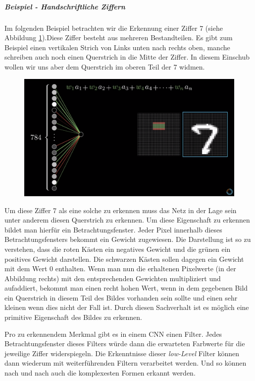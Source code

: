 \subparagraph{Beispiel - Handschriftliche Ziffern}
Im folgenden Beispiel betrachten wir die Erkennung einer Ziffer 7 (siehe Abbildung \ref{fig:cnn_filter}).Diese Ziffer besteht aus mehreren Bestandteilen. Es gibt zum Beispiel einen vertikalen Strich von Links unten nach rechts oben, manche schreiben auch noch einen Querstrich in die Mitte der Ziffer. In diesem Einschub wollen wir uns aber dem Querstrich im oberen Teil der 7 widmen. 

\begin{figure}[!htb]
	\centering
	\includegraphics[width=.7\linewidth]{img/filter}
	\label{fig:cnn_filter}
\end{figure}

Um diese Ziffer 7 als eine solche zu erkennen muss das Netz in der Lage sein unter anderem diesen Querstrich zu erkennen. Um diese Eigenschaft zu erkennen bildet man hierfür ein Betrachtungsfenster. Jeder Pixel innerhalb dieses Betrachtungsfensters bekommt ein Gewicht zugewiesen. Die Darstellung ist so zu verstehen, dass die roten Kästen ein negatives Gewicht und die grünen ein positives Gewicht darstellen. Die schwarzen Kästen sollen dagegen ein Gewicht mit dem Wert $0$ enthalten. Wenn man nun die erhaltenen Pixelwerte (in der Abbildung rechts) mit den entsprechenden Gewichten multipliziert und aufaddiert, bekommt man einen recht hohen Wert, wenn in dem gegebenen Bild ein Querstrich in diesem Teil des Bildes vorhanden sein sollte und einen sehr kleinen wenn dies nicht der Fall ist. Durch diesen Sachverhalt ist es möglich eine primitive Eigenschaft des Bildes zu erkennen.  

Pro zu erkennendem Merkmal gibt es in einem CNN einen Filter. Jedes Betrachtungsfenster dieses Filters würde dann die erwarteten Farbwerte für die jeweilige Ziffer widerspiegeln. Die Erkenntnisse dieser \emph{low-Level} Filter können dann wiederum mit weiterführenden Filtern verarbeitet werden. Und so können nach und nach auch die komplexesten Formen erkannt werden. 

